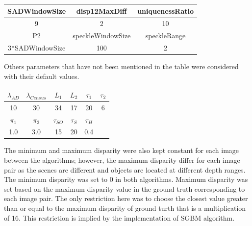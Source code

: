 \begin{minipage}{0.8\linewidth}
\begin{center}
\label{tab:sgbmparams}
\begin{tabular}{ |c|c|c| }
\hline
SADWindowSize & disp12MaxDiff & uniquenessRatio\\  \hline
9 & 2 & 10 \\ \hline
P2 & speckleWindowSize & speckleRange \\ \hline
3*SADWindowSize & 100 & 2  \\ \hline
\end{tabular}
\end{center}
\end{minipage} \newline \newline

Others parameters that have not been mentioned in the table were considered with their default values. \newline

\begin{minipage}{0.8\linewidth}
\begin{center}
\label{tab:adcparams}
\begin{tabular}{|c|c|c|c|c|c|}
\hline
$\lambda_{AD}$ & $\lambda_{Census}$ & $L_{1}$ & $L_{2}$ & $\tau_{1}$ & $\tau_{2}$ \\  \hline
10 & 30 & 34 & 17 & 20 & 6  \\ \hline
$\pi_{1}$ & $\pi_{2}$ & $\tau_{SO}$ & $\tau_{S}$ & $\tau_{H}$ & \\  \hline
1.0 & 3.0 & 15 & 20 & 0.4 &  \\ \hline
\end{tabular}
\end{center}
\end{minipage} \newline

The minimum and maximum disparity were also kept constant for each image between the algorithms; however, the maximum disparity differ for each image pair as the scenes are different
and objects are located at different depth ranges.
The minimum disparity was set to $0$ in both algorithms. Maximum disparity was set based on the maximum disparity value in the ground truth corresponding to each
image pair. The only restriction here was to choose the closest value greater than or equal to the maximum disparity of ground turth that is a multiplication of 16. This restriction
is implied by the implementation of SGBM algorithm.

